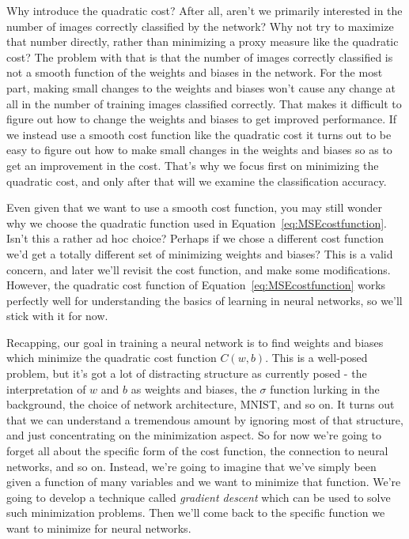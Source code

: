 Why introduce the quadratic cost? After all, aren't we primarily interested in the number of images correctly classified by the network? Why not try to maximize that number directly, rather than minimizing a proxy measure like the quadratic cost? The problem with that is that the number of images correctly classified is not a smooth function of the weights and biases in the network. For the most part, making small changes to the weights and biases won't cause any change at all in the number of training images classified correctly. That makes it difficult to figure out how to change the weights and biases to get improved performance. If we instead use a smooth cost function like the quadratic cost it turns out to be easy to figure out how to make small changes in the weights and biases so as to get an improvement in the cost. That's why we focus first on minimizing the quadratic cost, and only after that will we examine the classification accuracy.

Even given that we want to use a smooth cost function, you may still wonder why we choose the quadratic function used in Equation~\ref{eq:MSEcostfunction}. Isn't this a rather ad hoc choice? Perhaps if we chose a different cost function we'd get a totally different set of minimizing weights and biases? This is a valid concern, and later we'll revisit the cost function, and make some modifications. However, the quadratic cost function of Equation~\ref{eq:MSEcostfunction} works perfectly well for understanding the basics of learning in neural networks, so we'll stick with it for now.

Recapping, our goal in training a neural network is to find weights and biases which minimize the quadratic cost function $C(w,b)$. This is a well-posed problem, but it's got a lot of distracting structure as currently posed - the interpretation of $w$ and $b$ as weights and biases, the $\sigma$ function lurking in the background, the choice of network architecture, MNIST, and so on. It turns out that we can understand a tremendous amount by ignoring most of that structure, and just concentrating on the minimization aspect. So for now we're going to forget all about the specific form of the cost function, the connection to neural networks, and so on. Instead, we're going to imagine that we've simply been given a function of many variables and we want to minimize that function. We're going to develop a technique called \textit{gradient descent} which can be used to solve such minimization problems. Then we'll come back to the specific function we want to minimize for neural networks.

